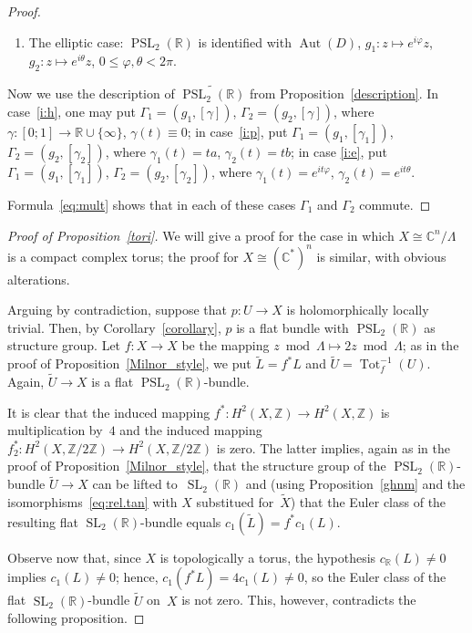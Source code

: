 \documentclass[11pt]{amsart}
\newcommand*{\C}{{\mathbb C}}
\newcommand*{\R}{{\mathbb R}}
\newcommand*{\Z}{{\mathbb Z}}
\newcommand*{\uPSL}{{\widetilde{\PSL_2(\R)}}}
\DeclareMathOperator{\Aut}{Aut}
\DeclareMathOperator{\PSL}{PSL}
\DeclareMathOperator{\SL}{SL}
\DeclareMathOperator{\Tot}{Tot}
\let\ph\varphi
\theoremstyle{remark}
\theoremstyle{definition}
\begin{document}
\begin{proof}
\begin{enumerate}
\item\label{i:e} The elliptic case: $\PSL_2(\R)$ is identified with
  $\Aut(D)$, $g_1\colon z\mapsto e^{i\ph} z$, $g_2\colon z\mapsto
  e^{i\theta} z$, $0\le \ph,\theta<2\pi$.
\end{enumerate}
Now we use the description of $\uPSL$ from
Proposition~\ref{description}. In case~\eqref{i:h}, one may put
$\Gamma_1=(g_1,[\gamma])$, $\Gamma_2=(g_2,[\gamma])$, where $\gamma\colon
[0;1]\to\R\cup\{\infty\}$, $\gamma(t)\equiv0$;
in case~\eqref{i:p},
put $\Gamma_1=(g_1,[\gamma_1])$, $\Gamma_2=(g_2,[\gamma_2])$, where
$\gamma_1(t)=ta$, $\gamma_2(t)=tb$;
in case \eqref{i:e},
put $\Gamma_1=(g_1,[\gamma_1])$, $\Gamma_2=(g_2,[\gamma_2])$, where
$\gamma_1(t)=e^{it\ph}$, $\gamma_2(t)=e^{it\theta}$. 

Formula~\eqref{eq:mult} shows that in each of these cases $\Gamma_1$
and $\Gamma_2$ commute.
\end{proof}


\begin{proof}[Proof of Proposition~\ref{tori}]
We will give a proof for the case in which $X\cong\C^n/\Lambda$ is a
compact complex torus; the proof for $X\cong(\C^*)^n$ is
similar, with obvious alterations.

Arguing by contradiction, suppose that $p\colon U\to X$ is
holomorphically locally trivial. Then, by Corollary~\ref{corollary},
$p$ is a flat bundle with $\PSL_2(\R)$ as structure group. Let
$f\colon X\to X$ be the mapping $z\bmod\Lambda\mapsto 2z\bmod\Lambda$;
as in the proof of Proposition~\ref{Milnor_style}, we put $\tilde
L=f^*L$ and $\tilde U=\Tot_f^{-1}(U)$. Again, $\tilde U\to X$ is a
flat $\PSL_2(\R)$-bundle.

It is clear that the induced mapping $f^*\colon H^2(X,\Z)\to
H^2(X,\Z)$ is multiplication by~$4$ and the induced mapping
$f^*_2\colon H^2(X,\Z/2\Z)\to H^2(X,\Z/2\Z)$ is zero. The latter
implies, again as in the proof of Proposition~\ref{Milnor_style}, that
the structure group of the $\PSL_2(\R)$-bundle $\tilde U\to X$ can be
lifted to~$\SL_2(\R)$ and (using Proposition~\ref{ghnm} and the
isomorphisms~\eqref{eq:rel.tan} with $X$ substitued for~$\tilde X$)
that the Euler class of the resulting flat $\SL_2(\R)$-bundle equals
$c_1(\tilde L)=f^* c_1(L)$.

Observe now that, since $X$ is topologically a torus, the hypothesis
$c_\R(L)\ne 0$ implies $c_1(L)\ne 0$; hence, $c_1(f^*L)=4c_1(L)\ne 0$,
so the Euler class of the flat $\SL_2(\R)$-bundle $\tilde U$ on~$X$ is
not zero. This, however, contradicts the following proposition.
\end{proof}
\end{document}
